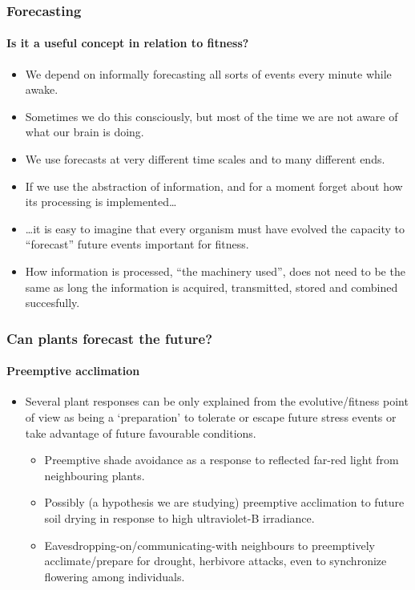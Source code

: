 \documentclass[utf8]{beamer}\usepackage[]{graphicx}\usepackage[]{color} %
\begin{document}
\begin{frame}[<+->]
  \frametitle{Forecasting}
  \framesubtitle{Is it a useful concept in relation to fitness?}
  \begin{itemize}
    \item We depend on informally forecasting all sorts of events every minute while awake.
    \item Sometimes we do this consciously, but most of the time we are not aware of what our brain is doing.
    \item We use forecasts at very different time scales and to many different ends.
    \item If we use the abstraction of information, and for a moment forget about how its processing is implemented\ldots
    \item \ldots it is easy to imagine that every organism must have evolved the capacity to ``forecast'' future events important for fitness.
    \item How information is processed, ``the machinery used'', does not need to be the same as long the information is acquired, transmitted, stored and combined succesfully.
  \end{itemize}
\end{frame}

\begin{frame}[<+->]
  \frametitle{Can plants forecast the future?}
  \framesubtitle{Preemptive acclimation}
  \begin{itemize}
    \item Several plant responses can be only explained from the evolutive/fitness
    point of view as being a `preparation' to tolerate or escape future stress events or
    take advantage of future favourable conditions.
    \begin{itemize}
    \item Preemptive shade avoidance as a response to reflected far-red light from neighbouring
    plants.
    \item Possibly (a hypothesis we are studying) preemptive acclimation to future soil
    drying in response to high ultraviolet-B irradiance.
    \item Eavesdropping-on/communicating-with neighbours to preemptively acclimate/prepare
    for drought, herbivore attacks, even to synchronize flowering among individuals.
  \end{itemize}
  \end{itemize}
\end{frame}
\end{document}
